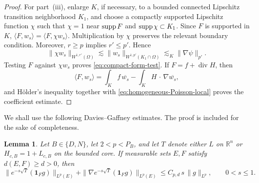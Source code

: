 \documentclass[12pt]{amsart}
\newcommand{\cdo}{\, \cdot \,}
\newcommand{\supp}{{\rm supp}{\hspace{.05cm}}}
\newcommand{\diver}{\operatorname{div}}
\newtheorem{lemma}[theorem]{Lemma}
\theoremstyle{remark}
\begin{document}
\begin{proof}
For part~\textup{(iii)}, enlarge \(K\), if necessary, to a bounded
connected Lipschitz transition neighborhood \(K_1\), and choose a
compactly supported Lipschitz function \(\chi\) such that
\(\chi=1\) near \(\supp F\) and \(\supp\chi\subset K_1\).  Since \(F\)
is supported in \(K\), $\langle F,w_s\rangle=\langle F,\chi w_s\rangle$. Multiplication by \(\chi\) preserves the relevant boundary condition. Moreover, \(r\geq p\) implies \(r'\leq p'\).  Hence
\[
 \|\chi w_s\|_{W^{1,r'}(\Omega)}
 \lesssim\|w_s\|_{W^{1,p'}(K_1\cap\Omega)}
 \lesssim_K\|\nabla\psi\|_{p'}.
\]
Testing \(F\) against \(\chi w_s\) proves
\eqref{eq:compact-form-test}.  If \(F=f+\diver H\), then
\[
 \langle F,w_s\rangle
 =\int_K f\,\overline{w_s}
  -\int_K H\mathbin{\cdo}\nabla\overline{w_s},
\]
and H\"older's inequality together with
\eqref{eq:homogeneous-Poisson-local} proves the coefficient estimate.
\end{proof}


We shall use the following Davies--Gaffney estimates. The proof is included for the sake of completeness.

\begin{lemma}\label{lem:automatic-ST}
Let \(B\in\{D,N\}\), let \(2<p<P_B\), and let \(T\) denote either
\(L\) on \(\mathbb R^n\) or \(H_{c,B}=1+L_{c,B}\) on the bounded core.
If measurable sets \(E,F\) satisfy \(d(E,F)\ge d>0\), then
\begin{equation}\label{eq:separated-short-time-conclusion}
 \|e^{-s\sqrt T}(\mathbf 1_Fg)\|_{L^p(E)}
 +\|\nabla e^{-s\sqrt T}(\mathbf 1_Fg)\|_{L^p(E)}
 \le C_{p,d}\,s\,\|g\|_{L^p},
 \qquad 0<s\le1 .
\end{equation}
\end{lemma}
\end{document}
